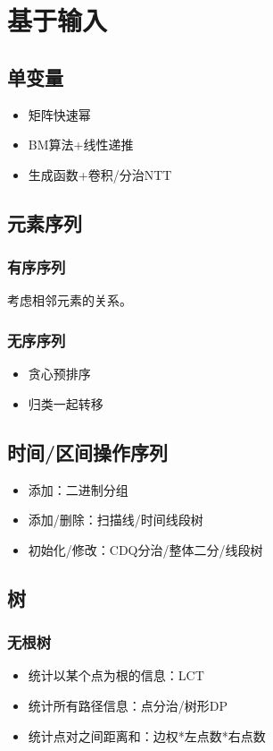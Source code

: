 \section{基于输入}
\subsection{单变量}
\begin{itemize}
    \item 矩阵快速幂
    \item BM算法+线性递推
    \item 生成函数+卷积/分治NTT
\end{itemize}
\subsection{元素序列}
\subsubsection{有序序列}
考虑相邻元素的关系。
\subsubsection{无序序列}
\begin{itemize}
    \item 贪心预排序
    \item 归类一起转移
\end{itemize}
\subsection{时间/区间操作序列}
\begin{itemize}
    \item 添加：二进制分组
    \item 添加/删除：扫描线/时间线段树
    \item 初始化/修改：CDQ分治/整体二分/线段树
\end{itemize}
\subsection{树}
\subsubsection{无根树}
\begin{itemize}
    \item 统计以某个点为根的信息：LCT
    \item 统计所有路径信息：点分治/树形DP
    \item 统计点对之间距离和：边权*左点数*右点数
\end{itemize}
